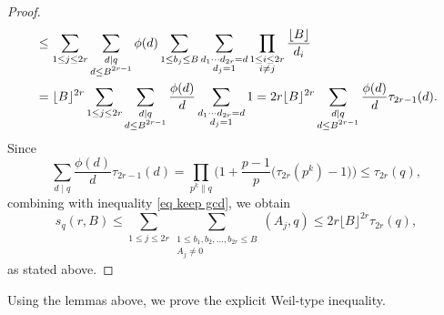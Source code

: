 \documentclass[12pt]{amsart}
\theoremstyle{plain}
\theoremstyle{definition}
\begin{document}
\begin{proof}
\begin{align}
&\le \sum_{1\le j\le 2r} \sum_{\substack{d\mid q \\ d\le B^{2r-1}}} \phi(d) \sum_{1\le b_j\le B} \sum_{\substack{d_1\cdots d_{2r}=d \\ d_j=1}} \prod_{\substack{1\le i\le 2r \\ i\ne j}} \frac {\lfloor B\rfloor}{d_i} \\ \notag
&= \lfloor B\rfloor^{2r} \sum_{1\le j\le 2r} \sum_{\substack{d\mid q \\ d\le B^{2r-1}}} \frac{\phi(d)}d \sum_{\substack{d_1\cdots d_{2r}=d \\ d_j=1}} 1 
= 2r \lfloor B\rfloor^{2r} \sum_{\substack{d\mid q \\ d\le B^{2r-1}}} \frac{\phi(d)}d \tau_{2r-1}(d).
\end{align}
Since
\[
\sum_{d\mid q} \frac{\phi(d)}d \tau_{2r-1}(d) = 
\prod_{p^k\|q} \biggl( 1 + \frac{p-1}p \bigl( \tau_{2r}(p^k) - 1 \bigr) \biggr) \le \tau_{2r}(q),
\]
combining with inequality \eqref{eq keep gcd}, we obtain
\[
s_q(r, B)
\le
\sum_{1\le j\le 2r} \mathop{\sum\nolimits}\limits_{\substack{1\le b_1,b_2,\dots,b_{2r}\le B \\ A_j\ne0}} (A_j,q) \le 2r \lfloor B\rfloor^{2r} \tau_{2r}(q),
\]
as stated above.
\end{proof}

Using the lemmas above, we prove the explicit Weil-type inequality.
\end{document}
